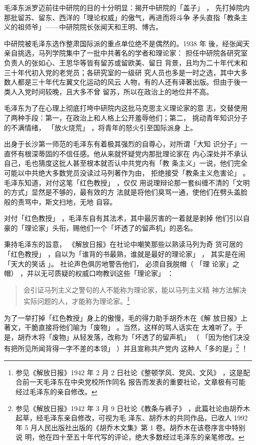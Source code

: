 毛泽东派罗迈前往中研院的目的十分明显：揭开中研院的「盖子」
，
先打掉院内那批留苏、留东、西洋的「理论权威」的傲气，再进而将斗争
矛头直指「教条主义的祖师爷」——中研院院长张闻天和王明、博古。

中研院被毛泽东选作整肃国际派的重点单位绝不是偶然的。1938 年
後，经张闻天亲自挑选，马列学院集中了一批中共著名的学者和理论家：
担任中研院各研究室负责人的张如心、王思华等皆有留苏或留欧美、留日
背景，且均为二十年代末和三十年代初入党的老党员；各研究室的一级研
究人员也多是一时之选，其中大多数人都是三十年代左翼文化运动的风云
人物，有的人还有译著出版。但由于後一类人入党时间较晚，且大多不曾
留苏，所以在政治上的地位并不高。

毛泽东为了在心理上彻底打垮中研院内这批马克思主义理论家的意
志，交替使用了两种手段：第一，在政治上和人格上公开羞辱他们；第二，
挑动青年知识分子的不满情绪，
「放火烧荒」
，将青年的怒火引至国际派身
上。

出身于长沙第一师范的毛泽东有着极其强烈的自尊心，对所谓「大知
识分子」一直怀有根深蒂固的不信任感。他从来就怀疑党内那批理论家在
内心深处并不承认自己，毛也猜度这批人甚至根本就否认中共党内有「教
条主义」一说，他们完全可能以中共绝大多数党员没读过马列著作为由，
拒绝接受「教条主义危害论」
。毛泽东知道，对付这笔「红色教授」
，仅仅
用说理辩论那一套纠缠不清的「文明的方式」显然是不够的，最有效的方
法就是将他们臭骂一通，使他们在劈头盖脸般的责骂中，斯文扫地，无地
自容。

对付「红色教授」
，毛泽东自有其法术，其中最厉害的一着就是剥掉
他们引以自豪的「理论家」头衔，赐他们一个「坏透了的留声机」的恶名。

秉持毛泽东的旨意，
《解放日报》在社论中嘲笑那些以熟读马列为奇
货可居的「红色教授」
，自以为「谁背的书最熟，谁就是最好的理论家」
，
其实是在闹
「天大的笑话 」。
社论声色俱厉地警告他们，
必须自我脱帽（ 「理
论家」之帽）
，并以无可质疑的权威口吻教训这些「理论家」
：
\begin{quote}
{\fzwkai 会引证马列主义之警句的人不能称为理论家，能以马列主义精
神方法解决实际问题的人，才能称为理论家。\footnote{参见《解放日报》1942 年 2 月 2 日社论《整顿学风、党风、文风》
，这是配合前一天毛泽东在中央党校所作同名
报告而发表的重要社论，文章极有可能经过毛泽东的亲自修改。} } 
\end{quote}
为了一举打掉「红色教授」身上的傲慢，毛的得力助手胡乔木在《解
放日报》上著文，干脆直接将他们喻为「废物」
。当然，这样的骂人话实在
太难听了。于是，胡乔木将「废物」从轻发落，改称为「坏透了的留声机」
（
「因为他们决没有把所见所闻背得一字不差的本领」
）并且宣称共产党内
这种人「多的是」\footnote{参见《解放日报》1942 年 3 月 9 日社论《教条与裤子》
，此篇社论由胡乔木起草，经毛泽东亲自修改，可视为毛
泽东、胡乔木的共同作品，已收人 1992 年 5 月人民出版社出版的《胡乔木文集》第 1 卷。胡乔木在该卷序言中特别说
明，他在四十至五十年代写的评论，绝大多数经过毛泽东的亲笔修改。
} 
！

